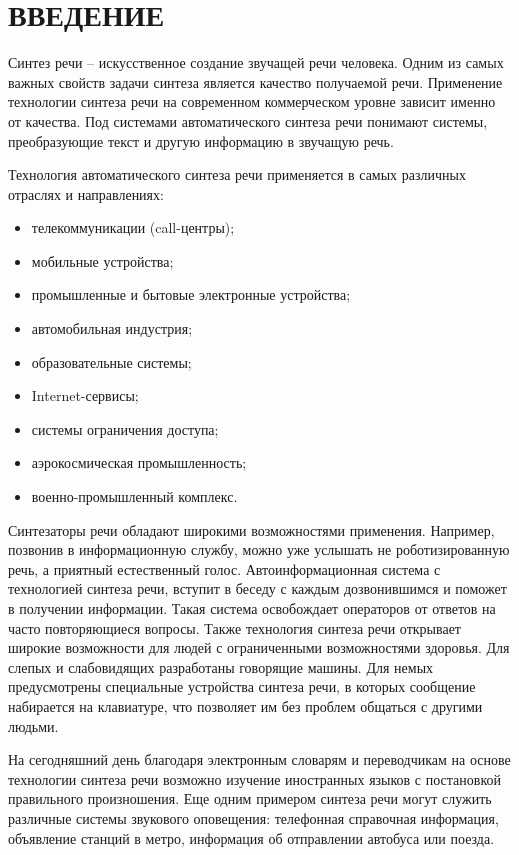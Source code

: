 \chapter*{\hfill ВВЕДЕНИЕ \hfill}

Синтез речи – искусственное создание звучащей речи человека. 
Одним из самых важных свойств задачи синтеза является качество получаемой речи. 
Применение технологии синтеза речи на современном коммерческом уровне зависит именно от качества. 
Под системами автоматического синтеза речи понимают системы, преобразующие текст и другую информацию в звучащую речь. 

Технология автоматического синтеза речи применяется в самых 
различных отраслях и направлениях:

\begin{itemize}[label=---]
\item телекоммуникации (call-центры);
\item мобильные устройства;
\item промышленные и бытовые электронные устройства;
\item автомобильная индустрия;
\item образовательные системы;
\item Internet-сервисы;
\item системы ограничения доступа;
\item аэрокосмическая промышленность;
\item военно-промышленный комплекс.
\end{itemize}

Синтезаторы речи обладают широкими возможностями применения. 
Например, позвонив в информационную службу, можно уже услышать не роботизированную речь, а приятный естественный голос. 
Автоинформационная система с технологией синтеза речи, вступит в беседу с каждым дозвонившимся и поможет в получении информации. 
Такая система освобождает операторов от ответов на часто повторяющиеся вопросы.
Также технология синтеза речи открывает широкие возможности для людей с ограниченными возможностями здоровья. 
Для слепых и слабовидящих разработаны говорящие машины. 
Для немых предусмотрены специальные устройства синтеза речи, в которых сообщение набирается на клавиатуре, что позволяет им без проблем общаться с другими людьми.

На сегодняшний день благодаря электронным словарям и переводчикам на основе технологии синтеза речи возможно изучение иностранных языков с постановкой правильного произношения. 
Еще одним примером синтеза речи могут служить различные системы звукового оповещения: телефонная справочная информация, объявление станций в метро, информация об отправлении автобуса или поезда.

